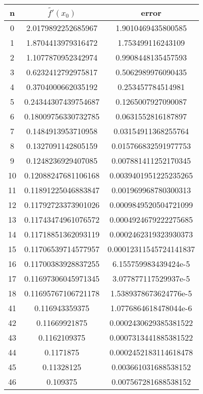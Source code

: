 \documentclass[12pt]{article}
\begin{document}
\begin{table}[]
	\centering
    \label{tab:table1}
    \begin{tabular}{|c|c|c|}
    		\hline
      	n & $\widetilde{f'}(x_0)$ & error \\
      	\hline
		0 & 2.0179892252685967 & 1.9010469435800585\\
\hline
1 & 1.8704413979316472 & 1.753499116243109\\
\hline
2 & 1.1077870952342974 & 0.9908448135457593\\
\hline
3 & 0.6232412792975817 & 0.5062989976090435\\
\hline
4 & 0.3704000662035192 & 0.253457784514981\\
\hline
5 & 0.24344307439754687 & 0.1265007927090087\\
\hline
6 & 0.18009756330732785 & 0.0631552816187897\\
\hline
7 & 0.1484913953710958 & 0.03154911368255764\\
\hline
8 & 0.1327091142805159 & 0.015766832591977753\\
\hline
9 & 0.1248236929407085 & 0.007881411252170345\\
\hline
10 & 0.12088247681106168 & 0.0039401951225235265\\
\hline
11 & 0.11891225046883847 & 0.001969968780300313\\
\hline
12 & 0.11792723373901026 & 0.0009849520504721099\\
\hline
13 & 0.11743474961076572 & 0.0004924679222275685\\
\hline
14 & 0.11718851362093119 & 0.0002462319323930373\\
\hline
15 & 0.11706539714577957 & 0.00012311545724141837\\
\hline
16 & 0.11700383928837255 & 6.155759983439424e-5\\
\hline
17 & 0.11697306045971345 & 3.077877117529937e-5\\
\hline
18 & 0.11695767106721178 & 1.5389378673624776e-5\\
\hline
\hline
41 & 0.116943359375 & 1.0776864618478044e-6\\
\hline
42 & 0.11669921875 & 0.0002430629385381522\\
\hline
43 & 0.1162109375 & 0.0007313441885381522\\
\hline
44 & 0.1171875 & 0.0002452183114618478\\
\hline
45 & 0.11328125 & 0.003661031688538152\\
\hline
46 & 0.109375 & 0.007567281688538152\\

\end{tabular}
\end{table}
\end{document}

